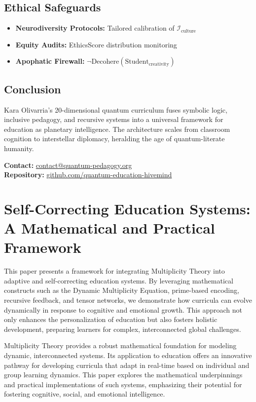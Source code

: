 \documentclass{article}
\theoremstyle{plain}
\theoremstyle{claimstyle}
\begin{document}
\subsection{Ethical Safeguards}
\begin{itemize}
    \item \textbf{Neurodiversity Protocols:} Tailored calibration of \(\mathcal{I}_{\text{culture}}\)
    \item \textbf{Equity Audits:} EthicsScore distribution monitoring
    \item \textbf{Apophatic Firewall:} \(\neg \text{Decohere}(\text{Student}_{\text{creativity}})\)
\end{itemize}

\subsection{Conclusion}
Kara Olivarria’s 20-dimensional quantum curriculum fuses symbolic logic, inclusive pedagogy, and recursive systems into a universal framework for education as planetary intelligence. The architecture scales from classroom cognition to interstellar diplomacy, heralding the age of quantum-literate humanity.

\vspace{0.5cm}
\noindent\textbf{Contact:} \href{mailto:contact@quantum-pedagogy.org}{contact@quantum-pedagogy.org} \\
\textbf{Repository:} \href{https://github.com/quantum-education-hivemind}{github.com/quantum-education-hivemind}
\section{Self-Correcting Education Systems: \\ A Mathematical and Practical Framework}


This paper presents a framework for integrating Multiplicity Theory into adaptive and self-correcting education systems. By leveraging mathematical constructs such as the Dynamic Multiplicity Equation, prime-based encoding, recursive feedback, and tensor networks, we demonstrate how curricula can evolve dynamically in response to cognitive and emotional growth. This approach not only enhances the personalization of education but also fosters holistic development, preparing learners for complex, interconnected global challenges.

Multiplicity Theory provides a robust mathematical foundation for modeling dynamic, interconnected systems. Its application to education offers an innovative pathway for developing curricula that adapt in real-time based on individual and group learning dynamics. This paper explores the mathematical underpinnings and practical implementations of such systems, emphasizing their potential for fostering cognitive, social, and emotional intelligence.
\end{document}
